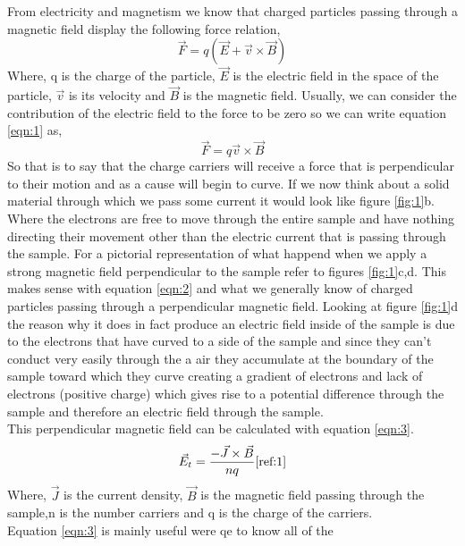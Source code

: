 \documentclass[twocolumn]{article}
\begin{document}
From electricity and magnetism we know that charged particles passing through 
a magnetic field display the following force relation,
\begin{equation}
\label{eqn:1}
\vec{F}=q(\vec{E}+\vec{v}\times\vec{B})
\end{equation}
Where, q is the charge of the particle, $\vec{E}$ is the electric field 
in the space of the particle, $\vec{v}$ is its velocity and $\vec{B}$ is the 
magnetic field. Usually, we can consider the contribution of the electric field 
to the force to be zero so we can write equation \ref{eqn:1} as,
\begin{equation}
\label{eqn:2}
\vec{F}=q\vec{v}\times\vec{B}
\end{equation}
So that is to say that the charge carriers will receive a force that is 
perpendicular to their motion and as a cause will begin to curve. If we now 
think about a solid material through which we pass some current it would look 
like figure \ref{fig:1}b. Where the electrons are free to move through the 
entire sample and have nothing directing their movement other than the electric 
current that is passing through the sample. For a pictorial representation of 
what happend when we apply a strong magnetic field perpendicular to the sample 
refer to figures \ref{fig:1}c,d. This makes sense with equation \ref{eqn:2} and 
what we generally know of charged particles passing through a perpendicular 
magnetic field. Looking at figure \ref{fig:1}d the reason why it does in fact 
produce an electric field inside of the sample is due to the electrons that 
have curved to a side of the sample and since they can't conduct very easily 
through the a air they accumulate at the boundary of the sample toward which 
they curve creating a gradient of electrons and lack of electrons (positive 
charge) which gives rise to a potential difference through the sample and 
therefore an electric field through the sample.
\\
This perpendicular magnetic field can be calculated with equation \ref{eqn:3}.
\begin{equation}
\vec{E}_t = \frac{-\vec{J}\times\vec{B}}{nq}
\cite{ref:1}
\label{eqn:3}
\end{equation}
Where, $\vec{J}$ is the current density, $\vec{B}$ is the magnetic field 
passing through the sample,n is the number carriers and q is the charge of the 
carriers.
\\
Equation \ref{eqn:3} is mainly useful were qe to know all of the 
\end{document}
